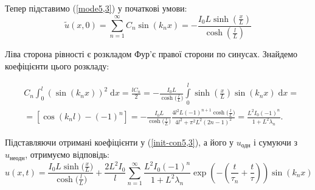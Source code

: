Тепер підставимо (\ref{mode5,3}) у початкові умови:
\begin{equation} \label{init-con5,3}
    \tilde{u}(x,0) = \sum_{n=1}^{\infty} C_n\sin\left(k_n x\right) = -\frac{I_0L\sinh{(\frac{x}{L})}}{\cosh{(\frac{l}{L})}}
\end{equation}

Ліва сторона рівності є розкладом Фур'є правої сторони по синусах. Знайдемо коефіцієнти цього розкладу:

\begin{equation*}
    \begin{aligned} 
        &C_n\int_{0}^{l} \left(\sin\left(k_n x\right)\right)^2\;\mathrm{d}x = \frac{lC_n}{2}
        = -\frac{I_0L}{\cosh{\big(\frac{l}{L}\big)}} \int\limits_{0}^{l} \sinh{\left(\frac{x}{L}\right)} \sin(k_nx)\;\mathrm{d}x =\\
        &= \left[\cos(k_nl) - (-1)^n \right] = -\frac{I_0L}{\cosh{\big(\frac{l}{L}\big)}} \frac{4l^2L(-1)^{n+1} \cosh{\big(\frac{l}{L}\big)}}{4l^2 + \pi^2L^2(2n-1)^2} = \frac{L^2I_0 (-1)^n}{1 + L^2\lambda_n}.
    \end{aligned}
\end{equation*}

Підставляючи отримані коефіцієнти у (\ref{init-con5,3}), а його у $u_{\text{одн}}$ і сумуючи з $u_{\text{неодн}}$, отримуємо відповідь:
\begin{equation*}
    u(x,t) = \frac{I_0L \sinh{\big(\frac{x}{L}\big)}}{\cosh{\big(\frac{l}{L}\big)}} + \frac{2L^2I_0}{l} \sum_{n=1}^{\infty} \frac{L^2I_0 (-1)^n}{1 + L^2\lambda_n} \exp{\left(-\left(\frac{t}{\tau_n} + \frac{t}{\tau}\right) \right)}\sin(k_nx)
\end{equation*}

%